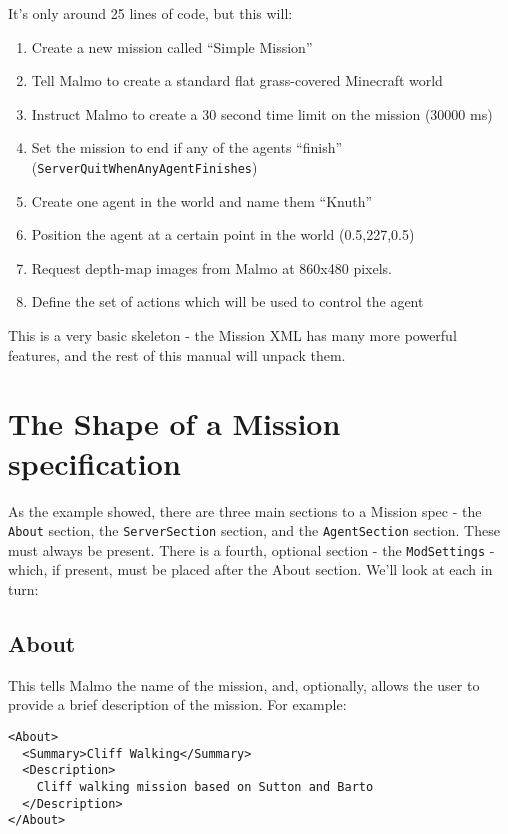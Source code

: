 \documentclass[11pt]{article} %
\begin{document}
It's only around 25 lines of code, but this will:
\begin{enumerate}
  \item Create a new mission called ``Simple Mission''
  \item Tell Malmo to create a standard flat grass-covered Minecraft world
  \item Instruct Malmo to create a 30 second time limit on the mission (30000 ms)
  \item Set the mission to end if any of the agents ``finish'' (\lstinline!ServerQuitWhenAnyAgentFinishes!)
  \item Create one agent in the world and name them ``Knuth''
  \item Position the agent at a certain point in the world (0.5,227,0.5)
  \item Request depth-map images from Malmo at 860x480 pixels.
  \item Define the set of actions which will be used to control the agent
\end{enumerate}

This is a very basic skeleton - the Mission XML has many more powerful features, and the rest of this manual will unpack them.

\section{The Shape of a Mission specification}
As the example showed, there are three main sections to a Mission spec - the \lstinline!About! section, the \lstinline!ServerSection! section, and the \lstinline!AgentSection! section. These must always be present. There is a fourth, optional section - the \lstinline!ModSettings! - which, if present, must be placed after the About section.
We'll look at each in turn:

\subsection{About}

This tells Malmo the name of the mission, and, optionally, allows the user to provide a brief description of the mission. For example:

\begin{lstlisting}[frame=lines]
<About>
  <Summary>Cliff Walking</Summary>
  <Description>
    Cliff walking mission based on Sutton and Barto
  </Description>
</About>
\end{lstlisting}
\end{document}
